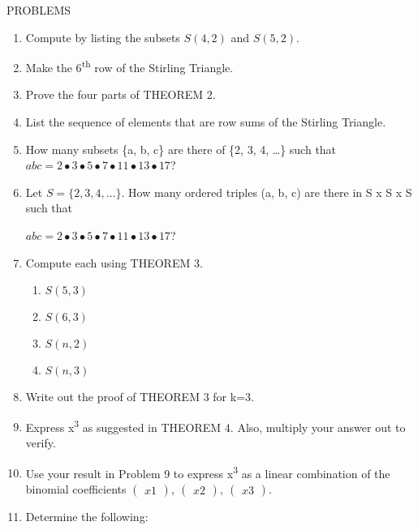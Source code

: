 \documentclass[10pt,letter]{article}
\begin{document}
PROBLEMS
\begin{enumerate}
\def\labelenumi{\arabic{enumi}.}

\item
  Compute by listing the subsets \(S(4,2)\) and \(S(5,2)\).
\item
  Make the 6\textsuperscript{th} row of the Stirling Triangle.
\item
  Prove the four parts of THEOREM 2.
\item
  List the sequence of elements that are row sums of the Stirling
  Triangle.
\item
  How many subsets \{a, b, c\} are there of \{2, 3, 4, \ldots{}\} such
  that
  \(abc = 2 \bullet 3 \bullet 5 \bullet 7 \bullet 11 \bullet 13 \bullet 17\)?
\item
  Let \(S = \{ 2,3,4,\ldots\}\). How many ordered triples (a, b, c) are
  there in S x S x S such that

\(abc = 2 \bullet 3 \bullet 5 \bullet 7 \bullet 11 \bullet 13 \bullet 17\)?
\item
  Compute each using THEOREM 3.
\begin{enumerate}
  \def\labelenumii{\alph{enumii}.}

  \item
    \(S\left( 5,3 \right)\)
  \item
    \(S(6,3)\)
  \item
    \(S(n,2)\)
  \item
    \(S(n,3)\)

\end{enumerate}
\item
  Write out the proof of THEOREM 3 for k=3.
\item
  Express x\textsuperscript{3} as suggested in THEOREM 4. Also, multiply
  your answer out to verify.
\item
  Use your result in Problem 9 to express x\textsuperscript{3} as a
  linear combination of the binomial coefficients \(\begin{pmatrix}
  x
  1
  \end{pmatrix}
,\
\begin{pmatrix}
  x
  2
  \end{pmatrix}
,\
\begin{pmatrix}
  x
  3
  \end{pmatrix}
\).
\item
  Determine the following:
\begin{enumerate}
  \def\labelenumii{\alph{enumii}.}


\end{enumerate}
\end{enumerate}
\end{document}
